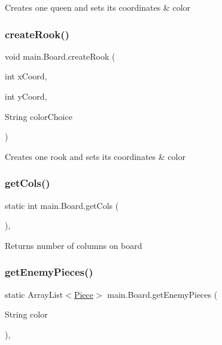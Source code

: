 Creates one queen and sets its coordinates \& color \mbox{\label{classmain_1_1_board_a1d50738826f5552a1a40b587fb347e19}} 
\subsubsection{\texorpdfstring{create\+Rook()}{createRook()}}
{\footnotesize\ttfamily void main.\+Board.\+create\+Rook (\begin{DoxyParamCaption}\item[{int}]{x\+Coord,  }\item[{int}]{y\+Coord,  }\item[{String}]{color\+Choice }\end{DoxyParamCaption})\hspace{0.3cm}{\ttfamily [inline]}}

Creates one rook and sets its coordinates \& color \mbox{\label{classmain_1_1_board_a0a0733e45369c0f8e424e772d07fbc81}} 
\subsubsection{\texorpdfstring{get\+Cols()}{getCols()}}
{\footnotesize\ttfamily static int main.\+Board.\+get\+Cols (\begin{DoxyParamCaption}{ }\end{DoxyParamCaption})\hspace{0.3cm}{\ttfamily [inline]}, {\ttfamily [static]}}

Returns number of columns on board \mbox{\label{classmain_1_1_board_a0e831a72f6f1cbf863dc42b9cd4a6de3}} 
\subsubsection{\texorpdfstring{get\+Enemy\+Pieces()}{getEnemyPieces()}}
{\footnotesize\ttfamily static Array\+List$<$\hyperlink{classmain_1_1pieces_1_1_piece}{Piece}$>$ main.\+Board.\+get\+Enemy\+Pieces (\begin{DoxyParamCaption}\item[{String}]{color }\end{DoxyParamCaption})\hspace{0.3cm}{\ttfamily [inline]}, {\ttfamily [static]}}

